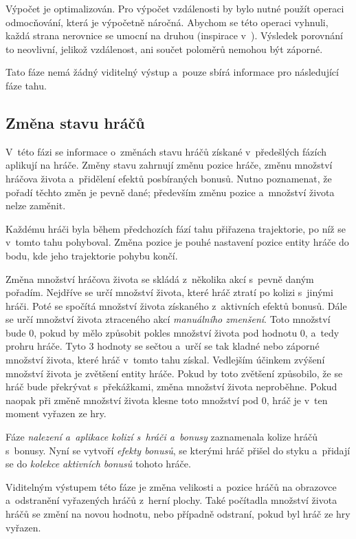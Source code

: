 Výpočet je optimalizován. Pro výpočet vzdálenosti by bylo nutné použít operaci odmocňování, která je výpočetně náročná. Abychom se této operaci vyhnuli, každá strana nerovnice se umocní na druhou (inspirace v~\cite{CGAL_Exact_Computation_paradigm}). Výsledek porovnání to neovlivní, jelikož vzdálenost, ani součet poloměrů nemohou být záporné.

Tato fáze nemá žádný viditelný výstup a~pouze sbírá informace pro následující fáze tahu.

\subsection*{Změna stavu hráčů}

V~této fázi se informace o~změnách stavu hráčů získané v~předešlých fázích aplikují na hráče. Změny stavu zahrnují změnu pozice hráče, změnu množství hráčova života a~přidělení efektů posbíraných bonusů. Nutno poznamenat, že pořadí těchto změn je pevně dané; především změnu pozice a~množství života nelze zaměnit.

Každému hráči byla během předchozích fází tahu přiřazena trajektorie, po níž se v~tomto tahu pohyboval. Změna pozice je pouhé nastavení pozice entity hráče do bodu, kde jeho trajektorie pohybu končí.

Změna množství hráčova života se skládá z~několika akcí s~pevně daným pořadím. Nejdříve se určí množství života, které hráč ztratí po kolizi s~jinými hráči. Poté se spočítá množství života získaného z~aktivních efektů bonusů. Dále se určí množství života ztraceného akcí \emph{manuálního zmenšení}. Toto množství bude 0, pokud by mělo způsobit pokles množství života pod hodnotu 0, a~tedy prohru hráče. Tyto 3 hodnoty se sečtou a~určí se tak kladné nebo záporné množství života, které hráč v~tomto tahu získal. Vedlejším účinkem zvýšení množství života je zvětšení entity hráče. Pokud by toto zvětšení způsobilo, že se hráč bude překrývat s~překážkami, změna množství života neproběhne. Pokud naopak při změně množství života klesne toto množství pod 0, hráč je v~ten moment vyřazen ze hry.

Fáze \emph{nalezení a~aplikace kolizí s~hráči a~bonusy} zaznamenala kolize hráčů s~bonusy. Nyní se vytvoří \emph{efekty bonusů}, se kterými hráč přišel do styku a~přidají se do \emph{kolekce aktivních bonusů} tohoto hráče.

Viditelným výstupem této fáze je změna velikosti a~pozice hráčů na obrazovce a~odstranění vyřazených hráčů z~herní plochy. Také počítadla množství života hráčů se změní na novou hodnotu, nebo případně odstraní, pokud byl hráč ze hry vyřazen.

